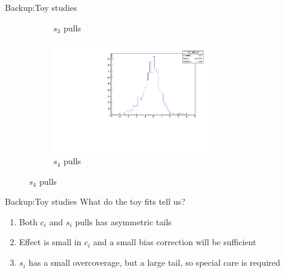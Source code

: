 \documentclass{beamer}
\begin{document}
\begin{frame}{Backup:Toy studies}
\begin{figure}
\begin{subfigure}{0.5\textwidth}
      \caption{$s_3$ pulls}
    \end{subfigure}%
    \begin{subfigure}{0.5\textwidth}
      \centering
      \includegraphics[width=0.75\textwidth]{Plots/s4_ToyFits_pull.pdf}
      \caption{$s_4$ pulls}
    \end{subfigure}
  \end{figure}
\end{frame}

\begin{frame}{Backup:Toy studies}
  \vspace{0.0cm}
  {\Large What do the toy fits tell us?}
  \vspace{1.0cm}
  \begin{enumerate}
    \setlength\itemsep{2.0em}
    \item{Both $c_i$ and $s_i$ pulls has asymmetric tails}
    \item{Effect is small in $c_i$ and a small bias correction will be sufficient}
    \item{$s_i$ has a small overcoverage, but a large tail, so special care is required}
  \end{enumerate}
\end{frame}
\end{document}
